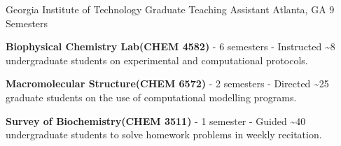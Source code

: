 \begin{cventries}
  \cventry
    {Georgia Institute of Technology} %
    {Graduate Teaching Assistant} %
    {Atlanta, GA} %
    {9 Semesters} %
    {
      \begin{cvitems} %
        \item {\textbf{Biophysical Chemistry Lab{\scriptsize (CHEM 4582)}} - 6 semesters - Instructed \textasciitilde8 undergraduate students on experimental and computational protocols.}
        \item {\textbf{Macromolecular Structure{\scriptsize (CHEM 6572)}} - 2 semesters - Directed \textasciitilde25 graduate students on the use of computational modelling programs.}
        \item {\textbf{Survey of Biochemistry{\scriptsize (CHEM 3511)}} - 1 semester - Guided \textasciitilde40 undergraduate students to solve homework problems in weekly recitation.}
      \end{cvitems}
    }


\vspace{-4.0mm}
\end{cventries}
